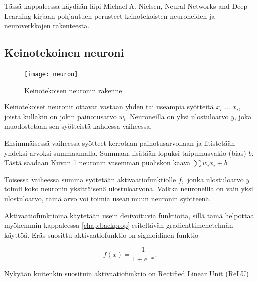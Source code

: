 \documentclass[finnish]{tktltiki2}
\theoremstyle{definition}
\theoremstyle{remark}
\begin{document}
  Tässä kappaleessa käydään läpi Michael A. Nielsen, Neural Networks and Deep Learning \cite{Nielsen-neural} kirjaan pohjautuen perusteet keinotekoisten neuroneiden ja neuroverkkojen rakenteesta. 

  \subsection{Keinotekoinen neuroni}
    \label{chap:artificial-neuron}

    \begin{figure}[h]
      \centering
      \texttt{[image: neuron]}
      \caption{Keinotekoisen neuronin rakenne}
      \label{pic:neuron}
    \end{figure}

    Keinotekoiset neuronit ottavat vastaan yhden tai useampia syötteitä $x_i$ ... $x_i$, joista kullakin on jokin painotusarvo $w_i$. Neuroneilla on yksi ulostuloarvo $y$, joka muodostetaan sen syötteistä kahdessa vaiheessa.

    Ensimmäisessä vaiheessa syötteet kerrotaan painotusarvollaan ja litistetään yhdeksi arvoksi summaamalla. Summaan lisätään lopuksi taipumusvakio (bias) $b$. Tästä saadaan Kuvan \ref{pic:neuron} neuronin vasemman puoliskon kaava $\sum w_i x_i + b$.

    Toisessa vaiheessa summa syötetään aktivaatiofunktiolle $f$, jonka ulostuloarvo $y$ toimii koko neuronin yksittäisenä ulostuloarvona. Vaikka neuroneilla on vain yksi ulostuloarvo, tämä arvo voi toimia usean muun neuronin syötteenä.

    Aktivaatiofunktioina käytetään usein derivoituvia funktioita, sillä tämä helpottaa myöhemmin kappaleessa \ref{chap:backprop} esiteltävän gradienttimenetelmän käyttöä. Eräs suosittu aktivaatiofunktio on sigmoidinen funktio

    \begin{equation}
      f(x) = \frac{1}{1 + e^{-x}}.
      \label{eq:sigmoid-func}
    \end{equation}

    \noindent Nykyään kuitenkin suosituin aktivaatiofunktio on Rectified Linear Unit (ReLU)
\end{document}
